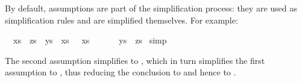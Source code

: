 \begin{isabelle}%
%
\begin{isamarkuptext}%
By default, assumptions are part of the simplification process: they are used
as simplification rules and are simplified themselves. For example:%
\end{isamarkuptext}%
\ {\isachardoublequote}{\isasymlbrakk}\ xs\ {\isacharat}\ zs\ {\isacharequal}\ ys\ {\isacharat}\ xs{\isacharsemicolon}\ {\isacharbrackleft}{\isacharbrackright}\ {\isacharat}\ xs\ {\isacharequal}\ {\isacharbrackleft}{\isacharbrackright}\ {\isacharat}\ {\isacharbrackleft}{\isacharbrackright}\ {\isasymrbrakk}\ {\isasymLongrightarrow}\ ys\ {\isacharequal}\ zs{\isachardoublequote}\isanewline
{}\ simp%
\begin{isamarkuptext}%
\noindent
The second assumption simplifies to , which in turn
simplifies the first assumption to , thus reducing the
conclusion to  and hence to .


\end{isamarkuptext}
\end{isabelle}
